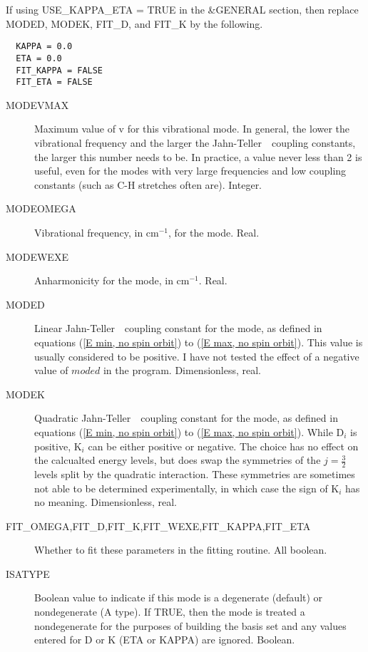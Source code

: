 \documentclass{article}
\newcommand{\wn}{cm$^{-1}$}
\newcommand{\JT}{Jahn-Teller\ }
\begin{document}
If using USE\_KAPPA\_ETA = TRUE in the \&GENERAL section, then replace MODED, MODEK, FIT\_D, and FIT\_K by the following.

\begin{verbatim}
  KAPPA = 0.0
  ETA = 0.0
  FIT_KAPPA = FALSE
  FIT_ETA = FALSE
\end{verbatim}

\begin{description}

\item[MODEVMAX] Maximum value of v for this vibrational mode. In
  general, the lower the vibrational frequency and the larger the \JT\
  coupling constants, the larger this number needs to be. In practice,
  a value never less than 2 is useful, even for the modes with very
  large frequencies and low coupling constants (such as C-H stretches
  often are). Integer.

\item[MODEOMEGA] Vibrational frequency, in \wn , for the mode. Real.

\item[MODEWEXE] Anharmonicity for the mode, in \wn . Real.

\item[MODED] Linear \JT\ coupling constant for the mode, as defined in
  equations (\ref{E min, no spin orbit}) to (\ref{E max, no spin
    orbit}). This value is usually considered to be positive. I have
  not tested the effect of a negative value of $moded$ in the
  program. Dimensionless, real.

\item[MODEK] Quadratic \JT\ coupling constant for the mode, as
  defined in equations (\ref{E min, no spin orbit}) to (\ref{E max, no spin
    orbit}). While D$_i$ is positive, K$_i$ can be either positive or
  negative. The choice has no effect on the calcualted energy levels,
  but does swap the symmetries of the $j=\frac{3}{2}$ levels split by
  the quadratic interaction. These symmetries are sometimes not able to be
  determined experimentally, in which case the sign of K$_i$ has
  no meaning. Dimensionless, real.

\item[FIT\_OMEGA,FIT\_D,FIT\_K,FIT\_WEXE,FIT\_KAPPA,FIT\_ETA] Whether to fit these
  parameters in the fitting routine.  All boolean.
  
\item[ISATYPE] Boolean value to indicate if this mode is a degenerate (default) or
  nondegenerate (A type). If TRUE, then the mode is treated a nondegenerate for the purposes
  of building the basis set and any values entered for D or K (ETA or KAPPA) are ignored. Boolean.


\end{description}
\end{document}
